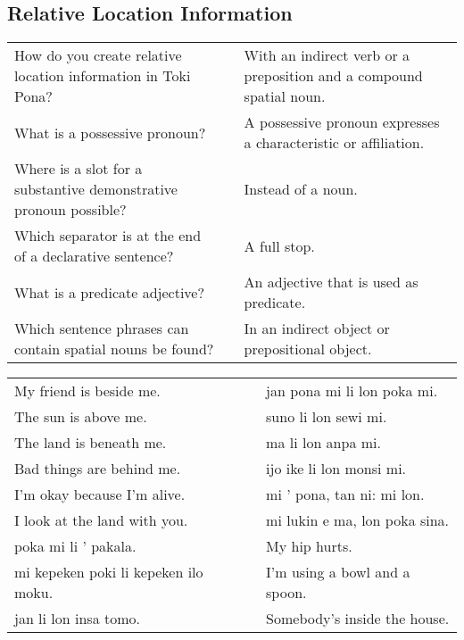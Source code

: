 \subsection*{Relative Location Information} 
\label{'other_prepositions'}
%
\begin{supertabular}{p{5,5cm}|ll}
How do you create relative location information in Toki Pona? && With an indirect verb or a preposition and a compound spatial noun. \\ %
What is a possessive pronoun? && A possessive pronoun expresses a characteristic or affiliation.  \\ %
Where is a slot for a substantive demonstrative pronoun possible? && Instead of a noun. \\ %
Which separator is at the end of a declarative sentence? && A full stop. \\ %
What is a predicate adjective? && An adjective that is used as predicate. \\ %
Which sentence phrases can contain spatial nouns be found? && In an indirect object or prepositional object.  \\ %
\end{supertabular}

\begin{supertabular}{p{5,5cm}|ll}
My friend is beside me. && jan pona mi li lon poka mi. \\ %
The sun is above me. && suno li lon sewi mi. \\ %
The land is beneath me. && ma li lon anpa mi. \\ %
Bad things are behind me. && ijo ike li lon monsi mi. \\ %
I'm okay because I'm alive. && mi ' pona, tan ni: mi lon. \\ %
I look at the land with you.  && mi lukin e ma, lon poka sina. \\ %
poka mi li ' pakala.  && My hip hurts. \\
mi kepeken poki li kepeken ilo moku.  && I'm using a bowl and a spoon. \\
jan li lon insa tomo.  && Somebody's inside the house. \\
\end{supertabular} 

